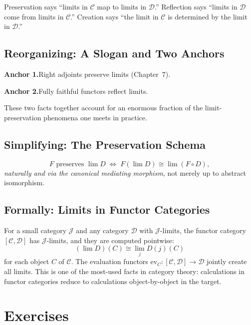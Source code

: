 Preservation says ``limits in $\mathcal{C}$ map to limits in $\mathcal{D}$.''
Reflection says ``limits in $\mathcal{D}$ come from limits in $\mathcal{C}$.''
Creation says ``the limit in $\mathcal{C}$ is determined by the limit in
$\mathcal{D}$.''

\subsection{Reorganizing: A Slogan and Two Anchors}

\textbf{Anchor 1.}\quad Right adjoints preserve limits (Chapter~7).

\textbf{Anchor 2.}\quad Fully faithful functors reflect limits.

These two facts together account for an enormous fraction of the
limit-preservation phenomena one meets in practice.

\subsection{Simplifying: The Preservation Schema}

\begin{equation*}
  F \text{ preserves } \lim D
  \;\iff\;
  F(\lim D) \cong \lim (F \circ D),
\end{equation*}
\emph{naturally and via the canonical mediating morphism}, not merely up
to abstract isomorphism.

\subsection{Formally: Limits in Functor Categories}

For a small category $\mathcal{J}$ and any category $\mathcal{D}$ with
$\mathcal{J}$-limits, the functor category $[\mathcal{C}, \mathcal{D}]$
has $\mathcal{J}$-limits, and they are computed pointwise:
\begin{equation*}
  (\lim D)(C) \cong \lim_{j} D(j)(C)
\end{equation*}
for each object $C$ of $\mathcal{C}$. The evaluation functors
$\mathrm{ev}_C : [\mathcal{C}, \mathcal{D}] \to \mathcal{D}$ jointly create
all limits. This is one of the most-used facts in category theory:
calculations in functor categories reduce to calculations object-by-object
in the target.


\section*{Exercises}

